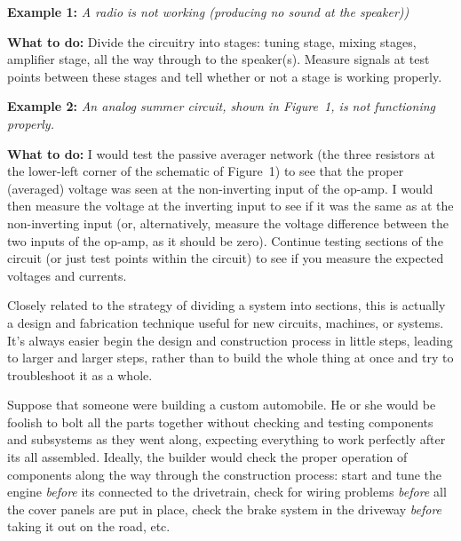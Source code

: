 {\bf Example 1:} {\em A radio is not working (producing no sound at the
speaker))}

{\bf What to do:} Divide the circuitry into stages: tuning stage, mixing
stages, amplifier stage, all the way through to the speaker(s). Measure
signals at test points between these stages and tell whether or not a
stage is working properly.

{\bf Example 2:} {\em An analog summer circuit, shown in Figure~1, is
not functioning properly.}

\stopplacefigure

{\bf What to do:} I would test the passive averager network (the three
resistors at the lower-left corner of the schematic of Figure~1) to see
that the proper (averaged) voltage was seen at the non-inverting input
of the op-amp. I would then measure the voltage at the inverting input
to see if it was the same as at the non-inverting input (or,
alternatively, measure the voltage difference between the two inputs of
the op-amp, as it should be zero). Continue testing sections of the
circuit (or just test points within the circuit) to see if you measure
the expected voltages and currents.

\stopsubsection

\startsubsection[title={Simplify And
Rebuild},reference={sec:xtocid157909711}]

Closely related to the strategy of dividing a system into sections, this
is actually a design and fabrication technique useful for new circuits,
machines, or systems. It's always easier begin the design and
construction process in little steps, leading to larger and larger
steps, rather than to build the whole thing at once and try to
troubleshoot it as a whole.

Suppose that someone were building a custom automobile. He or she would
be foolish to bolt all the parts together without checking and testing
components and subsystems as they went along, expecting everything to
work perfectly after its all assembled. Ideally, the builder would check
the proper operation of components along the way through the
construction process: start and tune the engine {\em before} its
connected to the drivetrain, check for wiring problems {\em before} all
the cover panels are put in place, check the brake system in the
driveway {\em before} taking it out on the road, etc.


